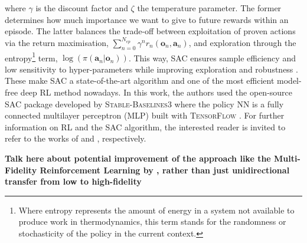 \noindent
where $\gamma$ is the discount factor and $\zeta$ the temperature parameter. The former determines how much importance we want to give to future rewards within an episode. The latter balances the trade-off between exploitation of proven actions via the return maximisation, \ie $\sum_{n=0}^{N_{ep}}\gamma^n r_n\left(\bm{o}_n,\bm{a}_n \right)$, and exploration through the entropy\footnote{Where entropy represents the amount of energy in a system not available to produce work in thermodynamics, this term stands for the randomness or stochasticity of the policy in the current context.} term, \ie $\log \left(\pi\left(\bm{a}_n | \bm{o}_n\right) \right)$. This way, \gls{SAC} ensures sample efficiency and low sensitivity to hyper-parameters while improving exploration \cite{haarnoja2017reinforcement} and robustness \cite{ziebart2010modeling}. These make \gls{SAC} a state-of-the-art algorithm and one of the most efficient model-free deep RL method nowadays. In this work, the authors used the open-source \gls{SAC} package developed by \textsc{Stable-Baselines3} \cite{raffin2021stable} where the policy \gls{NN} is a fully connected multilayer perceptron (MLP) built with \textsc{TensorFlow} \cite{abadi2016tensorflow}. For further information on \gls{RL} and the \gls{SAC} algorithm, the interested reader is invited to refer to the works of \citet{sutton2018reinforcement} and \citet{haarnoja2018soft}, respectively.


\textbf{Talk here about potential improvement of the approach like the Multi-Fidelity Reinforcement Learning by \citet{cutler2014reinforcement}, rather than just unidirectional transfer from low to high-fidelity}

